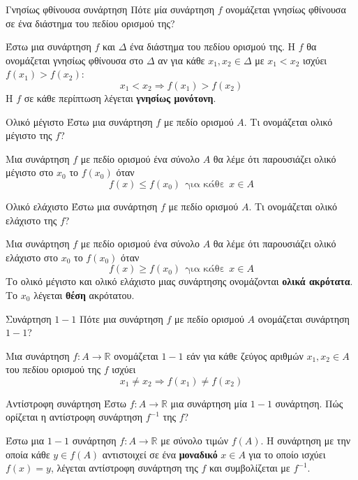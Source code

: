 \begin{Orismosbox}{Γνησίως φθίνουσα συνάρτηση}
\label{orismos:gnisiws_fthinousa}
Πότε μία συνάρτηση $f$ ονομάζεται γνησίως φθίνουσα σε ένα διάστημα του πεδίου ορισμού της?
\end{Orismosbox}\apanthsh
Έστω μια συνάρτηση $ f $ και $ \Delta $ ένα διάστημα του πεδίου ορισμού της. Η $ f $ θα ονομάζεται γνησίως φθίνουσα στο $\Delta $ αν για κάθε $ x_1,x_2\in\Delta $ με $ x_1<x_2 $ ισχύει $ f(x_1)>f(x_2) $:
\[ x_1<x_2\Rightarrow f(x_1)>f(x_2) \]
Η $ f $ σε κάθε περίπτωση λέγεται \textbf{γνησίως μονότονη}.
\begin{Orismosbox}{Ολικό μέγιστο}
\label{orismos:oliko_megisto}
Έστω μια συνάρτηση $f$ με πεδίο ορισμού $A$. Τι ονομάζεται ολικό μέγιστο της $f$?
\end{Orismosbox}
\apanthsh
Μια συνάρτηση $ f $ με πεδίο ορισμού ένα σύνολο $ A $ θα λέμε ότι παρουσιάζει ολικό μέγιστο στο $ x_0 $ το $ f(x_0) $ όταν 
\[ f(x)\leq f(x_0)\ \ \textrm{για κάθε}\ \ x\in A \]
\begin{Orismosbox}{Ολικό ελάχιστο}
\label{orismos:oliko_elaxisto}
Έστω μια συνάρτηση $f$ με πεδίο ορισμού $A$. Τι ονομάζεται ολικό ελάχιστο της $f$?
\end{Orismosbox}
\apanthsh
Μια συνάρτηση $ f $ με πεδίο ορισμού ένα σύνολο $ A $ θα λέμε ότι παρουσιάζει ολικό ελάχιστο στο $ x_0 $ το $ f(x_0) $ όταν 
\[ f(x)\geq f(x_0)\ \ \textrm{για κάθε}\ \ x\in A \]
Το ολικό μέγιστο και ολικό ελάχιστο μιας συνάρτησης ονομάζονται \textbf{ολικά ακρότατα}. Το $ x_0 $ λέγεται \textbf{θέση} ακρότατου.
\begin{Orismosbox}{Συνάρτηση $ 1-1 $}
\label{orismos:synarthsh_1_1}
Πότε μια συνάρτηση $f$ με πεδίο ορισμού $A$ ονομάζεται συνάρτηση $1-1$?
\end{Orismosbox}
\apanthsh
Μια συνάρτηση $ f:A\rightarrow\mathbb{R} $ ονομάζεται $ 1-1 $ εάν για κάθε ζεύγος αριθμών $ x_1,x_2\in A $ του πεδίου ορισμού της $ f $ ισχύει \[ x_1\neq x_2\Rightarrow f(x_1)\neq f(x_2) \]
\begin{Orismosbox}{Αντίστροφη συνάρτηση}
\label{orismos:antistrofh_synarthsh}
Έστω $ f:A\to\mathbb{R} $ μια συνάρτηση μία $1-1$ συνάρτηση. Πώς ορίζεται η αντίστροφη συνάρτηση $f^{-1}$ της $f$?
\end{Orismosbox}
\apanthsh
Έστω μια $1-1$ συνάρτηση $ f:A\to\mathbb{R} $ με σύνολο τιμών $ f(A) $. Η συνάρτηση με την οποία κάθε $ y\in f(A) $ αντιστοιχεί σε ένα \textbf{μοναδικό} $ x\in A $ για το οποίο ισχύει $ f(x)=y $, λέγεται αντίστροφη συνάρτηση της $ f $ και συμβολίζεται με $f^{-1}$.
\begin{center}
\end{center}
